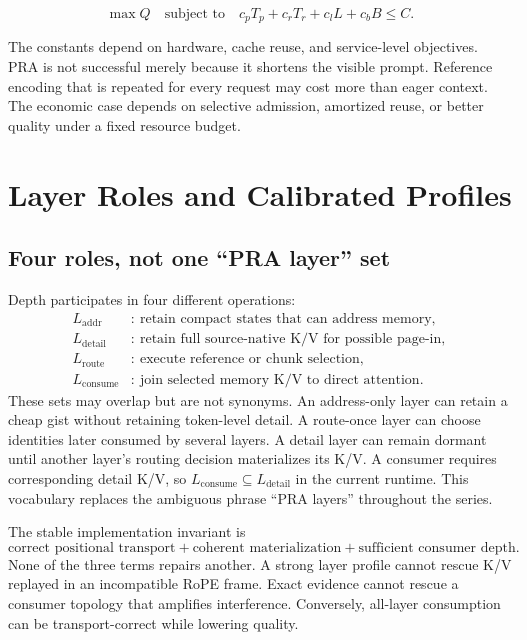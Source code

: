 \documentclass[11pt]{article}
\begin{document}
\begin{equation}
\max Q \quad \text{subject to} \quad
c_p T_p + c_r T_r + c_l L + c_b B \leq C.
\end{equation}

The constants depend on hardware, cache reuse, and service-level objectives. PRA is not successful merely because it shortens the visible prompt. Reference encoding that is repeated for every request may cost more than eager context. The economic case depends on selective admission, amortized reuse, or better quality under a fixed resource budget.

\section{Layer Roles and Calibrated Profiles}
\label{sec:layer-profiles}

\subsection{Four roles, not one ``PRA layer'' set}

Depth participates in four different operations:
\begin{align}
L_{\mathrm{addr}} &:\ \text{retain compact states that can address memory},\\
L_{\mathrm{detail}} &:\ \text{retain full source-native K/V for possible page-in},\\
L_{\mathrm{route}} &:\ \text{execute reference or chunk selection},\\
L_{\mathrm{consume}} &:\ \text{join selected memory K/V to direct attention}.
\end{align}
These sets may overlap but are not synonyms.  An address-only layer can retain a cheap gist without
retaining token-level detail.  A route-once layer can choose identities later consumed by several
layers.  A detail layer can remain dormant until another layer's routing decision materializes its
K/V.  A consumer requires corresponding detail K/V, so
$L_{\mathrm{consume}}\subseteq L_{\mathrm{detail}}$ in the current runtime.  This vocabulary
replaces the ambiguous phrase ``PRA layers'' throughout the series.

The stable implementation invariant is
\begin{equation}
\text{correct positional transport}
+\text{coherent materialization}
+\text{sufficient consumer depth}.
\end{equation}
None of the three terms repairs another.  A strong layer profile cannot rescue K/V replayed in an
incompatible RoPE frame.  Exact evidence cannot rescue a consumer topology that amplifies
interference.  Conversely, all-layer consumption can be transport-correct while lowering quality.
\end{document}
